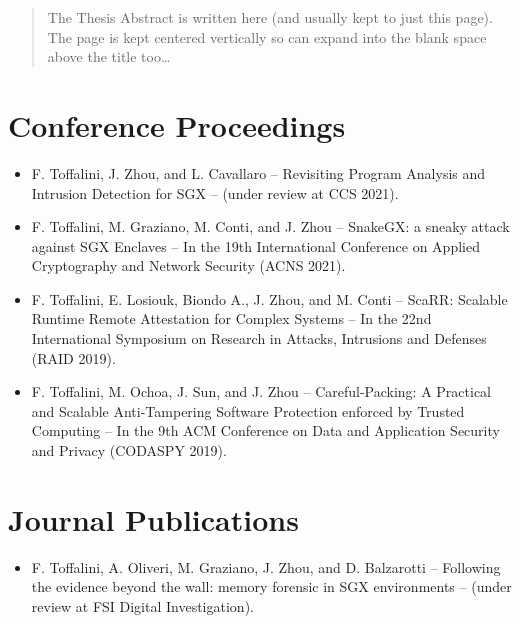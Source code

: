 \documentclass[
11pt, %
oneside, %
english, %
singlespacing, %
headsepline, %
]{MastersDoctoralThesis} %
\begin{document}
\begin{abstract}
\addchaptertocentry{\abstractname} %

The Thesis Abstract is written here (and usually kept to just this page). The page is kept centered vertically so can expand into the blank space above the title too\ldots

\end{abstract}


\begin{publications}
\addchaptertocentry{\publicationsname} %

\section*{Conference Proceedings}
\begin{itemize}
	
	\item F. Toffalini, J. Zhou, and L. Cavallaro -- Revisiting Program 
	Analysis and Intrusion Detection for SGX -- (under review at CCS 2021).
	
	\item F. Toffalini, M. Graziano, M. Conti, and J. Zhou -- SnakeGX: a sneaky 
	attack against SGX Enclaves -- In the 19th International Conference on 
	Applied Cryptography and Network Security (ACNS 2021).
	
	\item F. Toffalini, E. Losiouk, Biondo A., J. Zhou, and M. Conti -- ScaRR: 
	Scalable Runtime Remote Attestation for Complex Systems -- In the 22nd 
	International Symposium on Research in Attacks, Intrusions and Defenses 
	(RAID 2019).
	
	\item F. Toffalini, M. Ochoa, J. Sun, and J. Zhou -- Careful-Packing: A 
	Practical and Scalable Anti-Tampering Software Protection enforced by 
	Trusted Computing -- In the 9th ACM Conference on Data and Application 
	Security and Privacy (CODASPY 2019).
	
\end{itemize}

\section*{Journal Publications}
\begin{itemize}
	\item F. Toffalini, A. Oliveri, M. Graziano, J. Zhou, and D. Balzarotti -- 
	Following the evidence beyond the wall:	memory forensic in SGX 
	environments -- (under review at FSI Digital Investigation).
	

\end{itemize}
\end{publications}
\end{document}

